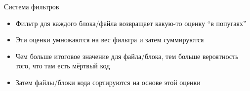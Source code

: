 \documentclass[aspectratio=169]{beamer}
\begin{document}
\begin{frame}{Система фильтров}
    \begin{itemize}
        \item Фильтр для каждого блока/файла возвращает какую-то оценку \enquote{в попугаях}
        \item Эти оценки умножаются на вес фильтра и затем суммируются
        \item Чем больше итоговое значение для файла/блока, тем больше вероятность того, что там есть мёртвый код
        \item Затем файлы/блоки кода сортируются на основе этой оценки
    \end{itemize}
\end{frame}
\end{document}
